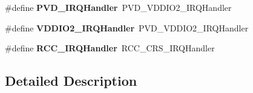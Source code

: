 \begin{DoxyCompactItemize}
\item 
\mbox{\label{group__stm32f042x6_ga045476dfaec8c84f5e16b06b937c0c18}} 
\#define {\bfseries P\+V\+D\+\_\+\+I\+R\+Q\+Handler}~P\+V\+D\+\_\+\+V\+D\+D\+I\+O2\+\_\+\+I\+R\+Q\+Handler
\item 
\mbox{\label{group__stm32f042x6_gac1854dcfbcf2950cee25063d73a5edb0}} 
\#define {\bfseries V\+D\+D\+I\+O2\+\_\+\+I\+R\+Q\+Handler}~P\+V\+D\+\_\+\+V\+D\+D\+I\+O2\+\_\+\+I\+R\+Q\+Handler
\item 
\mbox{\label{group__stm32f042x6_ga5a6d083fa78461da86a717b28973e009}} 
\#define {\bfseries R\+C\+C\+\_\+\+I\+R\+Q\+Handler}~R\+C\+C\+\_\+\+C\+R\+S\+\_\+\+I\+R\+Q\+Handler
\end{DoxyCompactItemize}


\subsection{Detailed Description}
